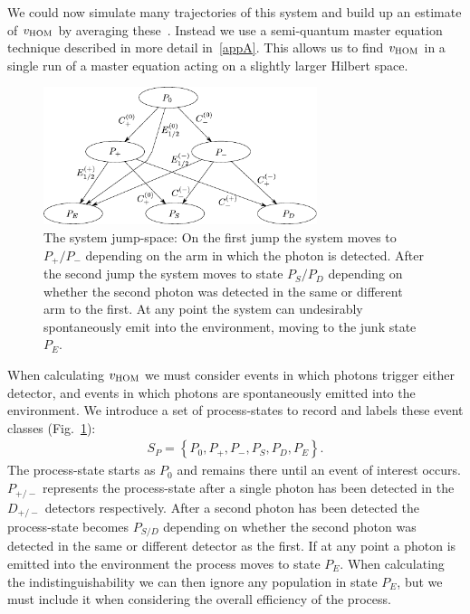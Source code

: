 We could now simulate many trajectories of this system and build up an estimate of $v_{\rm HOM}$ by averaging these~\cite{carmichael:92}. Instead we use a semi-quantum master equation technique described in more detail in~\ref{appA}. This allows us to find $v_{\rm HOM}$ in a single run of a master equation acting on a slightly larger Hilbert space.

\begin{figure}[htb]
  \begin{center}
  \includegraphics[width=8cm]{assets/subspace_partition.pdf}
\end{center}
  \caption{The system jump-space: On the first jump the system moves to $P_+ / P_-$ depending on the arm in which the photon is detected. After the second jump the system moves to state $P_S / P_D$ depending on whether the second photon was detected in the same or different arm to the first. At any point the system can undesirably spontaneously emit into the environment, moving to the junk state $P_E$.}
  \label{subspace_partition}
\end{figure}

When calculating $v_{\rm HOM}$ we must consider events in which photons trigger either detector, and events in which photons are spontaneously emitted into the environment. We introduce a set of process-states to record and labels these event classes (Fig.~\ref{subspace_partition}):
\begin{eqnarray}
  S_P = \left\{ P_0, P_+, P_-, P_S, P_D, P_E \right\}.
\end{eqnarray}
The process-state starts as $P_0$ and remains there until an event of interest occurs. $P_{+/-}$ represents the process-state after a single photon has been detected in the $D_{+/-}$ detectors respectively. After a second photon has been detected the process-state becomes $P_{S/D}$ depending on whether the second photon was detected in the same or different detector as the first. If at any point a photon is emitted into the environment the process moves to state $P_E$. When calculating the indistinguishability we can then ignore any population in state $P_E$, but we must include it when considering the overall efficiency of the process.

